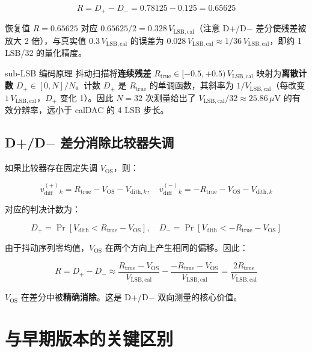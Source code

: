 \documentclass[UTF8,a4paper,11pt]{ctexart}
\newcommand{\Vlsb}{V_{\mathrm{LSB,cal}}}
\newcommand{\Vdith}{V_{\mathrm{dith}}}
\newcommand{\vdiff}{v_{\mathrm{diff}}}
\begin{document}
\begin{equation}
R = D_+ - D_- = 0.78125 - 0.125 = 0.65625
\end{equation}

恢复值 $R = 0.65625$ 对应 $0.65625 / 2 = 0.328\,\Vlsb$（注意 D+/D$-$ 差分使残差被放大 2 倍），与真实值 $0.3\,\Vlsb$ 的误差为 $0.028\,\Vlsb \approx 1/36\,\Vlsb$，即约 1 LSB/32 的量化精度。

\begin{keybox}{sub-LSB 编码原理}
抖动扫描将\textbf{连续残差} $R_{\mathrm{true}} \in [-0.5, +0.5)\,\Vlsb$ 映射为\textbf{离散计数} $D_+ \in [0, N]/N$。计数 $D_+$ 是 $R_{\mathrm{true}}$ 的单调函数，其斜率为 $1/\Vlsb$（每改变 $1\,\Vlsb$，$D_+$ 变化 1）。因此 $N=32$ 次测量给出了 $\Vlsb/32 \approx 25.86\,\mu\mathrm{V}$ 的有效分辨率，远小于 calDAC 的 4 LSB 步长。
\end{keybox}

\subsection{D+/D$-$ 差分消除比较器失调}

如果比较器存在固定失调 $V_{\mathrm{OS}}$，则：

\begin{equation}
\vdiff^{(+)}_k = R_{\mathrm{true}} - V_{\mathrm{OS}} - V_{\mathrm{dith},k}, \quad \vdiff^{(-)}_k = -R_{\mathrm{true}} - V_{\mathrm{OS}} - V_{\mathrm{dith},k}
\end{equation}

对应的判决计数为：

\begin{equation}
D_+ = \Pr[\Vdith < R_{\mathrm{true}} - V_{\mathrm{OS}}], \quad D_- = \Pr[\Vdith < -R_{\mathrm{true}} - V_{\mathrm{OS}}]
\end{equation}

由于抖动序列零均值，$V_{\mathrm{OS}}$ 在两个方向上产生相同的偏移。因此：

\begin{equation}
R = D_+ - D_- \approx \frac{R_{\mathrm{true}} - V_{\mathrm{OS}}}{\Vlsb} - \frac{-R_{\mathrm{true}} - V_{\mathrm{OS}}}{\Vlsb} = \frac{2 R_{\mathrm{true}}}{\Vlsb}
\end{equation}

$V_{\mathrm{OS}}$ 在差分中被\textbf{精确消除}。这是 D+/D$-$ 双向测量的核心价值。

\section{与早期版本的关键区别}
\end{document}
